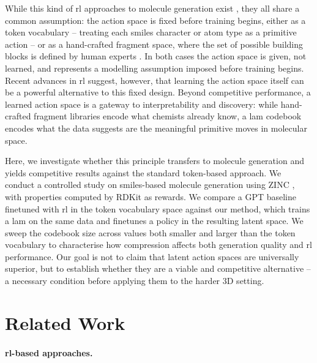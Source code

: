 \documentclass[10pt]{article} %
\begin{document}
While this kind of \gls{rl} approaches to molecule generation exist \citep{zhou_optimization_2019, you2018graph, ghugare_searching_2023, hu2024novo, loeffler2024reinvent, yang_hit_2021}, they all share a common assumption: the action space is fixed before training begins, either as a token vocabulary -- treating each \gls{smiles} character or atom type as a primitive action \citep{ghugare_searching_2023, hu2024novo, loeffler2024reinvent} -- or as a hand-crafted fragment space, where the set of possible building blocks is defined by human experts \citep{yang_hit_2021, zhou_optimization_2019}.
In both cases the action space is given, not learned, and represents a modelling assumption imposed before training begins.
Recent advances in \gls{rl} \citep{rybkin2019clasp,edwards2019ilpo,ye2023ficc,schmidt2024lapo,bruce2024genie} suggest, however, that learning the action space itself can be a powerful alternative to this fixed design.
Beyond competitive performance, a learned action space is a gateway to interpretability and discovery: while hand-crafted fragment libraries encode what chemists already know, a \gls{lam} codebook encodes what the data suggests are the meaningful primitive moves in molecular space.

Here, we investigate whether this principle transfers to molecule generation and yields competitive results against the standard token-based approach.
We conduct a controlled study on \gls{smiles}-based molecule generation using ZINC \citep{irwin2012zinc}, with properties computed by RDKit \citep{landrum2006rdkit} as rewards.
We compare a GPT baseline finetuned with \gls{rl} in the token vocabulary space against our method, which trains a \gls{lam} on the same data and finetunes a policy in the resulting latent space.
We sweep the codebook size across values both smaller and larger than the token vocabulary to characterise how compression affects both generation quality and \gls{rl} performance.
Our goal is not to claim that latent action spaces are universally superior, but to establish whether they are a viable and competitive alternative -- a necessary condition before applying them to the harder 3D setting.


\section{Related Work}

\paragraph{\gls{rl}-based approaches.}
\end{document}
